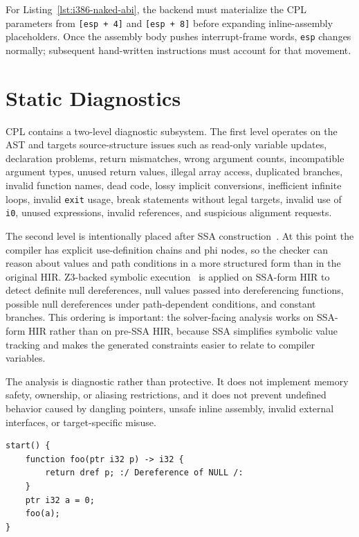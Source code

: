 \documentclass[10pt,twocolumn]{article}
\begin{document}
\par For Listing~\ref{lst:i386-naked-abi}, the backend must materialize the CPL parameters from \texttt{[esp + 4]} and \texttt{[esp + 8]} before expanding inline-assembly placeholders. Once the assembly body pushes interrupt-frame words, \texttt{esp} changes normally; subsequent hand-written instructions must account for that movement.

\section{Static Diagnostics}
\par CPL contains a two-level diagnostic subsystem. The first level operates on the AST and targets source-structure issues such as read-only variable updates, declaration problems, return mismatches, wrong argument counts, incompatible argument types, unused return values, illegal array access, duplicated branches, invalid function names, dead code, lossy implicit conversions, inefficient infinite loops, invalid \texttt{exit} usage, break statements without legal targets, invalid use of \texttt{i0}, unused expressions, invalid references, and suspicious alignment requests.
\par The second level is intentionally placed after SSA construction~\cite{cytron1991ssa}. At this point the compiler has explicit use-definition chains and phi nodes, so the checker can reason about values and path conditions in a more structured form than in the original HIR. Z3-backed symbolic execution~\cite{deMoura2008z3} is applied on SSA-form HIR to detect definite null dereferences, null values passed into dereferencing functions, possible null dereferences under path-dependent conditions, and constant branches. This ordering is important: the solver-facing analysis works on SSA-form HIR rather than on pre-SSA HIR, because SSA simplifies symbolic value tracking and makes the generated constraints easier to relate to compiler variables.
\par The analysis is diagnostic rather than protective. It does not implement memory safety, ownership, or aliasing restrictions, and it does not prevent undefined behavior caused by dangling pointers, unsafe inline assembly, invalid external interfaces, or target-specific misuse.

\begin{lstlisting}[language=CPL,caption={Example that triggers SSA-level null-dereference diagnostics.}]
start() {
    function foo(ptr i32 p) -> i32 {
        return dref p; :/ Dereference of NULL /:
    }
    ptr i32 a = 0;
    foo(a);
}
\end{lstlisting}
\end{document}
